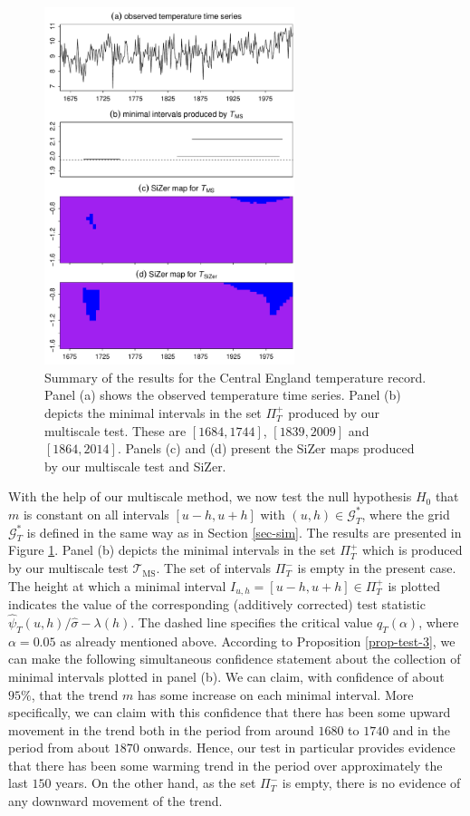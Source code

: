 \begin{figure}[t!]
\centering
\includegraphics[width=0.65\textwidth]{Plots/UK_temperature.pdf}
\caption{Summary of the results for the Central England temperature record. Panel (a) shows the observed temperature time series. Panel (b) depicts the minimal intervals in the set $\Pi_T^+$ produced by our multiscale test. These are $[1684,1744]$, $[1839,2009]$ and $[1864,2014]$. Panels (c) and (d) present the SiZer maps produced by our multiscale test and SiZer. }\label{fig:app:UK}
\end{figure}


With the help of our multiscale method, we now test the null hypothesis $H_0$ that $m$ is constant on all intervals $[u-h,u+h]$ with $(u,h) \in \mathcal{G}_T^*$, where the grid $\mathcal{G}_T^*$ is defined in the same way as in Section \ref{sec-sim}. The results are presented in Figure \ref{fig:app:UK}. Panel (b) depicts the minimal intervals in the set $\Pi_T^+$ which is produced by our multiscale test $\mathcal{T}_{\text{MS}}$. The set of intervals $\Pi_T^-$ is empty in the present case. The height at which a minimal interval $I_{u,h} = [u-h,u+h] \in \Pi_T^+$ is plotted indicates the value of the corresponding (additively corrected) test statistic $\widehat{\psi}_T(u,h) / \widehat{\sigma} - \lambda(h)$. The dashed line specifies the critical value $q_T(\alpha)$, where $\alpha = 0.05$ as already mentioned above. According to Proposition \ref{prop-test-3}, we can make the following simultaneous confidence statement about the collection of minimal intervals plotted in panel (b). We can claim, with confidence of about $95\%$, that the trend $m$ has some increase on each minimal interval. More specifically, we can claim with this confidence that there has been some upward movement in the trend both in the period from around $1680$ to $1740$ and in the period from about $1870$ onwards. Hence, our test in particular provides evidence that there has been some warming trend in the period over approximately the last $150$ years. On the other hand, as the set $\Pi_T^-$ is empty, there is no evidence of any downward movement of the trend.


